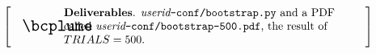 \documentclass[titlepage]{tufte-book}
\makeatletter
\newenvironment{callout}[1]{
\[
  \left[
      \begin{tabular}{@{\quad}m{.05\textwidth}@{\qquad}m{.75\textwidth}@{\quad}}
        \scalebox{1.5}{#1} & 
          \raggedright%
}
{
      \end{tabular}
    \right]
\]
}
\makeatother
\begin{document}
\begin{fullwidth}

\begin{callout}{\bcplume}
{\bf Deliverables}. {\em userid}{\tt -conf/bootstrap.py} and a PDF called {\em userid}{\tt -conf/bootstrap-500.pdf}, the result of $TRIALS=500$.
\end{callout}

\end{fullwidth}
\end{document}
